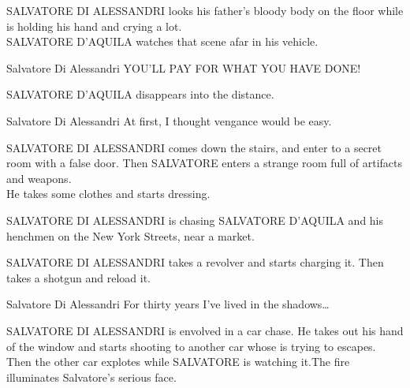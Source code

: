 \documentclass{screenplay}[2020/03/26]
\begin{document}

\fadein
{}
SALVATORE DI ALESSANDRI looks his father's bloody body on the floor while is holding his hand and crying a lot.
\\SALVATORE D'AQUILA watches that scene afar in his vehicle.

\begin{dialogue}{Salvatore Di Alessandri}
YOU'LL PAY FOR WHAT YOU HAVE DONE!
\end{dialogue}

SALVATORE D'AQUILA disappears into the distance.

\begin{dialogue}[narrating]{Salvatore Di Alessandri}
At first, I thought vengance would be easy.
\end{dialogue}


\fadein
{}
SALVATORE DI ALESSANDRI comes down the stairs, and enter to a secret room with a false door. Then SALVATORE enters a strange room full of artifacts and weapons.
\\He takes some clothes and starts dressing.


\fadeout
{}
SALVATORE DI ALESSANDRI is chasing SALVATORE D'AQUILA and his henchmen on the New York Streets, near a market.


\fadein
{}
SALVATORE DI ALESSANDRI takes a revolver and starts charging it. Then takes a shotgun and reload it.

\begin{dialogue}[narrating]{Salvatore Di Alessandri}
For thirty years I've lived in the shadows\dots
\end{dialogue}


\fadeout
{}
SALVATORE DI ALESSANDRI is envolved in a car chase. He takes out his hand of the window and starts shooting to another car whose is trying to escapes.
\\Then the other car explotes while SALVATORE is watching it.The fire illuminates Salvatore's serious face.
\end{document}
